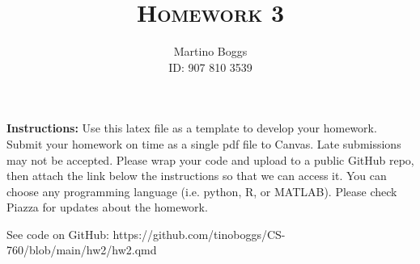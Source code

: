 \documentclass[a4paper]{article}
\title{\textsc{Homework 3}} %
\author{
Martino Boggs \\
ID: 907 810 3539\\
}
\date{}
\theoremstyle{definition}
\newenvironment{soln}{
    \leavevmode\color{blue}\ignorespaces
}{}
\begin{document}
\maketitle 


\textbf{Instructions:} 
Use this latex file as a template to develop your homework. Submit your homework on time as a single pdf file to Canvas. Late submissions may not be accepted. Please wrap your code and upload to a public GitHub repo, then attach the link below the instructions so that we can access it. You can choose any programming language (i.e. python, R, or MATLAB). Please check Piazza for updates about the homework.

\medskip

\begin{soln} See code on GitHub: https://github.com/tinoboggs/CS-760/blob/main/hw2/hw2.qmd \end{soln}
\end{document}
